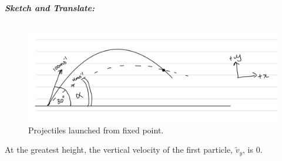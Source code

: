 \begin{subquestions}
	
\subquestion

\textbf{\textit{Sketch and Translate:}} \\ \\
\begin{figure}[H]
	\begin{center}
		\includegraphics[scale=0.25]{../2008/figures/2008Jq6-1}
		\caption{\label{2008J:q6:Sketch1} Projectiles launched from fixed point.}
	\end{center}
\end{figure}
At the greatest height, the vertical velocity of the first particle, $\tilde{v}_y$, is 0.





\end{subquestions}
